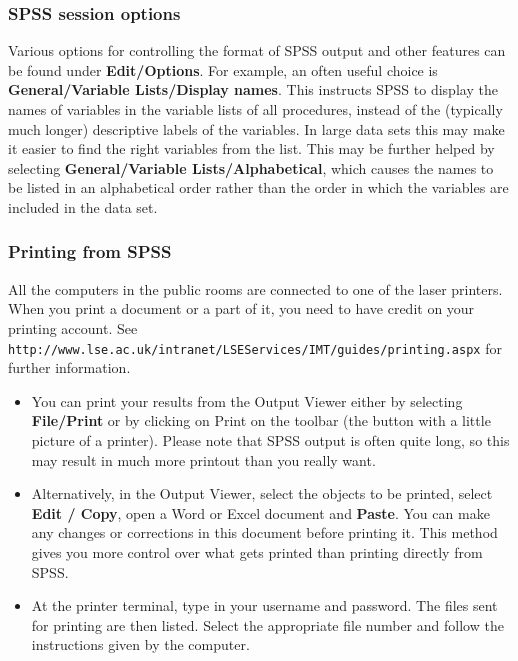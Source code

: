 \subsubsection{SPSS session options}

Various options for controlling the format of SPSS output and other
features can be found under \textbf{Edit/Options}. For example,
an often useful choice is
\textbf{General/Variable Lists/Display names}\label{p_listoptions}. This
instructs SPSS to display the names of
variables in the variable lists of all procedures, instead of the
(typically much longer) descriptive labels of the variables. In large
data sets this may make it easier to find the right variables from the
list. This may be further helped by
selecting \textbf{General/Variable Lists/Alphabetical}, which causes the
names to be listed in an alphabetical order rather than the
order in which the variables are included in the data set.


\subsubsection{Printing from SPSS}


All the computers in the public rooms are connected to one of the
laser printers. When you print a document or a part of it, you need to
have credit on your printing account.
See
\small{\texttt{http://www.lse.ac.uk/intranet/LSEServices/IMT/guides/printing.aspx}}
\normalsize
for further information.

\begin{itemize}
\item
You can print your results from the Output Viewer either by selecting
\textbf{File/Print} or by clicking on Print on the toolbar (the button
with a little picture of a printer). Please note that SPSS output is
often quite long, so this may result in much more printout than you
really want.
\item
Alternatively, in the Output Viewer, select the objects to be printed,
select \textbf{Edit / Copy}, open a Word or Excel document
and \textbf{Paste}. You can make any changes or corrections in this
document before printing it. This method gives you more control over
what gets printed than printing directly from SPSS.
\item
At the printer terminal, type in your username and password. The files
sent for printing are then listed.  Select the appropriate file number
and follow the instructions given by the computer.
\end{itemize}

